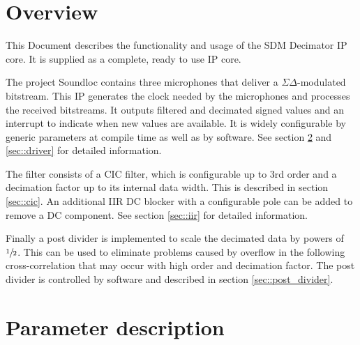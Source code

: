 


\maketitle


\section{Overview}
\label{sec:overview}

This Document describes the functionality and usage of the SDM Decimator IP core.
It is supplied as a complete, ready to use IP core.

The project Soundloc contains three microphones that deliver a $\Sigma\Delta$-modulated bitstream.
This IP generates the clock needed by the microphones and processes the received bitstreams.
It outputs filtered and decimated signed values and an interrupt to indicate when new values are available.
It is widely configurable by generic parameters at compile time as well as by software.
See section \ref{sec::parameters} and \ref{sec::driver} for detailed information.

The filter consists of a CIC filter, which is configurable up to 3rd order and a decimation factor up to its internal data width.
This is described in section \ref{sec::cic}.
An additional IIR DC blocker with a configurable pole can be added to remove a DC component. 
See section \ref{sec::iir} for detailed information.

Finally a post divider is implemented to scale the decimated data by powers of $\sfrac{1}{2}$.
This can be used to eliminate problems caused by overflow in the following cross-correlation that may occur with high order and decimation factor.
The post divider is controlled by software and described in section \ref{sec::post_divider}.

\section{Parameter description}
\label{sec::parameters}

